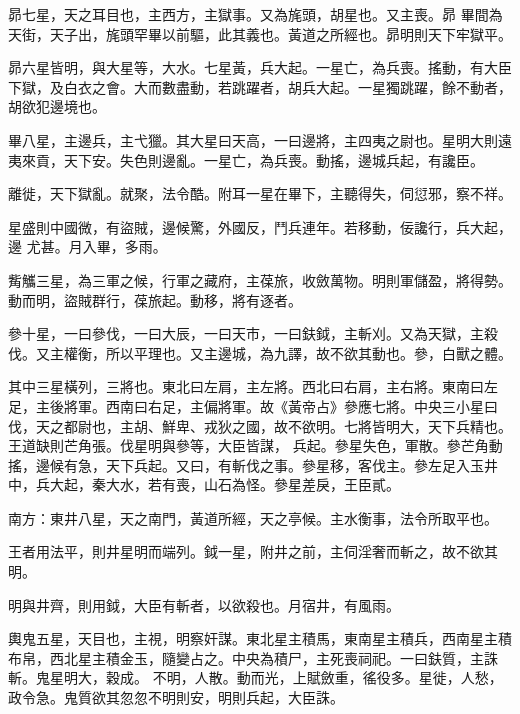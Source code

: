 \begin{pinyinscope}
 昴七星，天之耳目也，主西方，主獄事。又為旄頭，胡星也。又主喪。昴
 畢間為天街，天子出，旄頭罕畢以前驅，此其義也。黃道之所經也。昴明則天下牢獄平。



 昴六星皆明，與大星等，大水。七星黃，兵大起。一星亡，為兵喪。搖動，有大臣下獄，及白衣之會。大而數盡動，若跳躍者，胡兵大起。一星獨跳躍，餘不動者，胡欲犯邊境也。



 畢八星，主邊兵，主弋獵。其大星曰天高，一曰邊將，主四夷之尉也。星明大則遠夷來貢，天下安。失色則邊亂。一星亡，為兵喪。動搖，邊城兵起，有讒臣。



 離徙，天下獄亂。就聚，法令酷。附耳一星在畢下，主聽得失，伺愆邪，察不祥。



 星盛則中國微，有盜賊，邊候驚，外國反，鬥兵連年。若移動，佞讒行，兵大起，邊
 尤甚。月入畢，多雨。



 觜觿三星，為三軍之候，行軍之藏府，主葆旅，收斂萬物。明則軍儲盈，將得勢。動而明，盜賊群行，葆旅起。動移，將有逐者。



 參十星，一曰參伐，一曰大辰，一曰天市，一曰鈇鉞，主斬刈。又為天獄，主殺伐。又主權衡，所以平理也。又主邊城，為九譯，故不欲其動也。參，白獸之體。



 其中三星橫列，三將也。東北曰左肩，主左將。西北曰右肩，主右將。東南曰左足，主後將軍。西南曰右足，主偏將軍。故《黃帝占》參應七將。中央三小星曰伐，天之都尉也，主胡、鮮卑、戎狄之國，故不欲明。七將皆明大，天下兵精也。王道缺則芒角張。伐星明與參等，大臣皆謀，
 兵起。參星失色，軍散。參芒角動搖，邊候有急，天下兵起。又曰，有斬伐之事。參星移，客伐主。參左足入玉井中，兵大起，秦大水，若有喪，山石為怪。參星差戾，王臣貳。



 南方：東井八星，天之南門，黃道所經，天之亭候。主水衡事，法令所取平也。



 王者用法平，則井星明而端列。鉞一星，附井之前，主伺淫奢而斬之，故不欲其明。



 明與井齊，則用鉞，大臣有斬者，以欲殺也。月宿井，有風雨。



 輿鬼五星，天目也，主視，明察奸謀。東北星主積馬，東南星主積兵，西南星主積布帛，西北星主積金玉，隨變占之。中央為積尸，主死喪祠祀。一曰鈇質，主誅斬。鬼星明大，穀成。
 不明，人散。動而光，上賦斂重，徭役多。星徙，人愁，政令急。鬼質欲其忽忽不明則安，明則兵起，大臣誅。




\end{pinyinscope}
